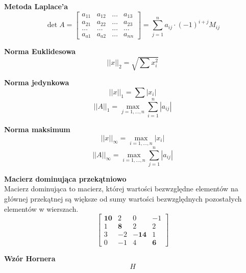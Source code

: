 \documentclass[../mn-notatki.tex]{subfiles}
\begin{document}
\begin{tcolorbox}
\textbf{Metoda Laplace'a}
\[
\det A =
\begin{bmatrix}
a_{11} & a_{12} & \ldots &a_{13}\\
a_{21} & a_{22} & \ldots &a_{23}\\
\ldots & \ldots & \ldots &\ldots\\
a_{a1} & a_{a2} & \ldots &a_{nn}
\end{bmatrix}
=
\sum_{j=1}^{n} a_{ij} \cdot (-1)^{i+j} M_{ij}
\]
\end{tcolorbox}

\begin{tcolorbox}
\textbf{Norma Euklidesowa}
\[
||x||_2 = \sqrt{\sum x_i^2}
\]
\end{tcolorbox}

\begin{tcolorbox}
\textbf{Norma jedynkowa}
\[
||x||_1 = \sum |x_i|
\]
\[
||A||_1 = \max_{j = 1, \ldots, n} \sum_{i = 1}^{n} |a_{ij}|
\]
\end{tcolorbox}

\begin{tcolorbox}
\textbf{Norma maksimum}
\[
||x||_\infty = \max_{i = 1, \ldots, n} |x_i|
\]
\[
||A||_\infty = \max_{i = 1, \ldots, n} \sum_{j = 1}^{n} |a_{ij}|
\]
\end{tcolorbox}

\begin{tcolorbox}
\textbf{Macierz dominująca przekątniowo}\\
Macierz dominująca to macierz, której wartości bezwzględne elementów na głównej
przekątnej są większe od sumy wartości bezwzględnych pozostałych elementów w
wierszach.
\[
{\displaystyle {\begin{bmatrix}\mathbf {10} &2&0&-1\\1&\mathbf {8} &2&2\\3&-2&\mathbf {-14} &1\\0&-1&4&\mathbf {6} \end{bmatrix}}}
\]
\end{tcolorbox}

\begin{tcolorbox}
\textbf{Wzór Hornera}\\
\[
H
\]
\end{tcolorbox}

\pagebreak
\end{document}
